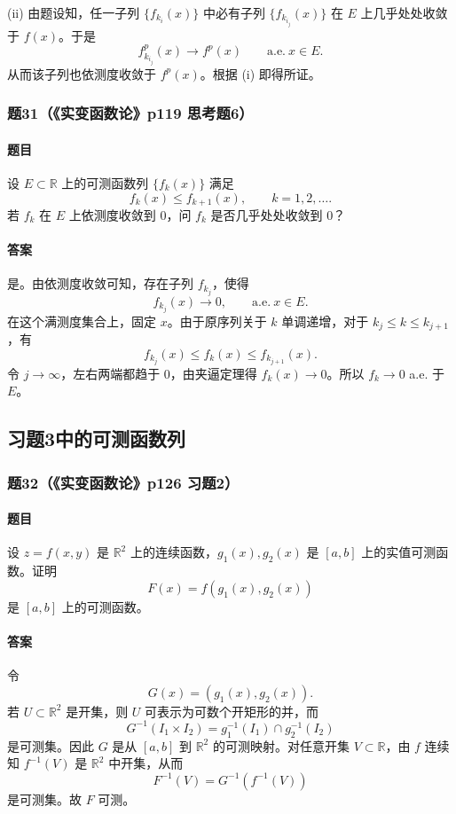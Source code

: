 \documentclass{article}
\newcommand{\R}{\mathbb{R}}
\newcommand{\aee}{\text{a.e.}}
\begin{document}
	(ii) 由题设知，任一子列 $\{f_{k_i}(x)\}$ 中必有子列 $\{f_{k_{i_j}}(x)\}$ 在 $E$ 上几乎处处收敛于 $f(x)$。于是
	\[
	f_{k_{i_j}}^p(x)\to f^p(x)\qquad \aee\ x\in E.
	\]
	从而该子列也依测度收敛于 $f^p(x)$。根据 (i) 即得所证。
	
	\subsubsection*{题31（《实变函数论》p119 思考题6）}
	\paragraph{题目}设 $E\subset\R$ 上的可测函数列 $\{f_k(x)\}$ 满足
	\[
	f_k(x)\le f_{k+1}(x),\qquad k=1,2,\ldots.
	\]
	若 $f_k$ 在 $E$ 上依测度收敛到 $0$，问 $f_k$ 是否几乎处处收敛到 $0$？
	
	\paragraph{答案}是。由依测度收敛可知，存在子列 $f_{k_j}$，使得
	\[
	f_{k_j}(x)\to0,
	\qquad \aee\ x\in E.
	\]
	在这个满测度集合上，固定 $x$。由于原序列关于 $k$ 单调递增，对于 $k_j\le k\le k_{j+1}$，有
	\[
	f_{k_j}(x)\le f_k(x)\le f_{k_{j+1}}(x).
	\]
	令 $j\to\infty$，左右两端都趋于 $0$，由夹逼定理得 $f_k(x)\to0$。所以 $f_k\to0$ a.e. 于 $E$。
	
	\subsection{习题3中的可测函数列}
	
	\subsubsection*{题32（《实变函数论》p126 习题2）}
	\paragraph{题目}设 $z=f(x,y)$ 是 $\R^2$ 上的连续函数，$g_1(x),g_2(x)$ 是 $[a,b]$ 上的实值可测函数。证明
	\[
	F(x)=f(g_1(x),g_2(x))
	\]
	是 $[a,b]$ 上的可测函数。
	
	\paragraph{答案}令
	\[
	G(x)=(g_1(x),g_2(x)).
	\]
	若 $U\subset\R^2$ 是开集，则 $U$ 可表示为可数个开矩形的并，而
	\[
	G^{-1}(I_1\times I_2)=g_1^{-1}(I_1)\cap g_2^{-1}(I_2)
	\]
	是可测集。因此 $G$ 是从 $[a,b]$ 到 $\R^2$ 的可测映射。对任意开集 $V\subset\R$，由 $f$ 连续知 $f^{-1}(V)$ 是 $\R^2$ 中开集，从而
	\[
	F^{-1}(V)=G^{-1}(f^{-1}(V))
	\]
	是可测集。故 $F$ 可测。
	
\end{document}
